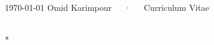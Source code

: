 \documentclass[11pt, a4paper]{awesome-cv}
\begin{document}
\makecvheader

\makecvfooter
  {\today}
  {Omid Karimpour~~~·~~~Curriculum Vitae}
  {\thepage}






\newpage




%




%
%
%
%
%
\\*


\end{document}
